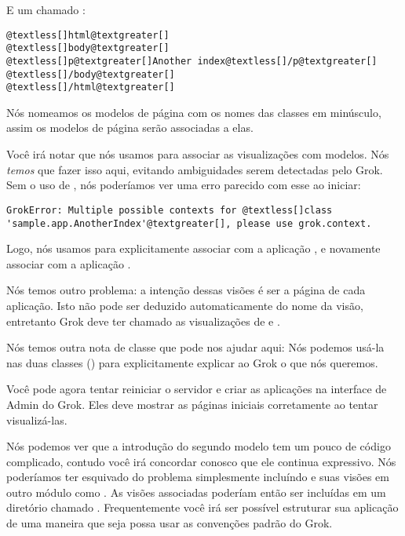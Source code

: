 \documentclass[a4paper,12pt,portuguese]{manual}
\begin{document}
E um chamado :

\begin{Verbatim}[commandchars=@\[\]]
@textless[]html@textgreater[]
@textless[]body@textgreater[]
@textless[]p@textgreater[]Another index@textless[]/p@textgreater[]
@textless[]/body@textgreater[]
@textless[]/html@textgreater[]
\end{Verbatim}

Nós nomeamos os modelos de página com os nomes das classes em
minúsculo, assim os modelos de página serão associadas a elas.

Você irá notar que nós usamos  para associar as
visualizações com modelos. Nós \emph{temos}  que fazer isso aqui, evitando
ambiguidades serem detectadas pelo Grok. Sem o uso de
, nós poderíamos ver uma erro parecido com esse ao
iniciar:

\begin{Verbatim}[commandchars=@\[\]]
GrokError: Multiple possible contexts for @textless[]class
'sample.app.AnotherIndex'@textgreater[], please use grok.context.
\end{Verbatim}

Logo, nós usamos  para explicitamente associar
 com a aplicação , e novamente associar
 com a aplicação .

Nós temos outro problema: a intenção dessas visões é ser a
página  de cada aplicação. Isto não pode ser deduzido
automaticamente do nome da visão, entretanto Grok deve ter
chamado as visualizações de  e  .

Nós temos outra nota de classe que pode nos ajudar aqui: 
Nós podemos usá-la nas duas classes () para
explicitamente explicar ao Grok o que nós queremos.

Você pode agora tentar reiniciar o servidor e criar as aplicações
na interface de Admin do Grok. Eles deve mostrar as páginas
iniciais corretamente ao tentar visualizá-las.

Nós podemos ver que a introdução do segundo modelo tem um pouco de
código complicado, contudo você irá concordar conosco que ele continua
expressivo. Nós poderíamos ter esquivado do problema simplesmente
incluíndo  e suas visões em outro módulo como .
As visões associadas poderíam então ser incluídas em um diretório
chamado . Frequentemente você irá ser possível
estruturar sua aplicação de uma maneira que seja possa usar as
convenções padrão do Grok.
\end{document}
